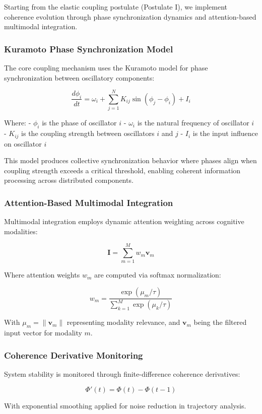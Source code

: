 \documentclass[11pt,a4paper]{article}
\begin{document}
Starting from the elastic coupling postulate (Postulate I), we implement coherence evolution through phase synchronization dynamics and attention-based multimodal integration.

\subsubsection{Kuramoto Phase Synchronization Model}

The core coupling mechanism uses the Kuramoto model for phase synchronization between oscillatory components:

\[
\frac{d\phi_i}{dt} = \omega_i + \sum_{j=1}^{N} K_{ij} \sin(\phi_j - \phi_i) + I_i
\]

Where:
- $\phi_i$ is the phase of oscillator $i$
- $\omega_i$ is the natural frequency of oscillator $i$
- $K_{ij}$ is the coupling strength between oscillators $i$ and $j$
- $I_i$ is the input influence on oscillator $i$

This model produces collective synchronization behavior where phases align when coupling strength exceeds a critical threshold, enabling coherent information processing across distributed components.

\subsubsection{Attention-Based Multimodal Integration}

Multimodal integration employs dynamic attention weighting across cognitive modalities:

\[
\mathbf{I} = \sum_{m=1}^{M} w_m \mathbf{v}_m
\]

Where attention weights $w_m$ are computed via softmax normalization:

\[
w_m = \frac{\exp(\mu_m / \tau)}{\sum_{k=1}^{M} \exp(\mu_k / \tau)}
\]

With $\mu_m = \|\mathbf{v}_m\|$ representing modality relevance, and $\mathbf{v}_m$ being the filtered input vector for modality $m$.

\subsubsection{Coherence Derivative Monitoring}

System stability is monitored through finite-difference coherence derivatives:

\[
\Phi'(t) = \Phi(t) - \Phi(t-1)
\]

With exponential smoothing applied for noise reduction in trajectory analysis.
\end{document}

